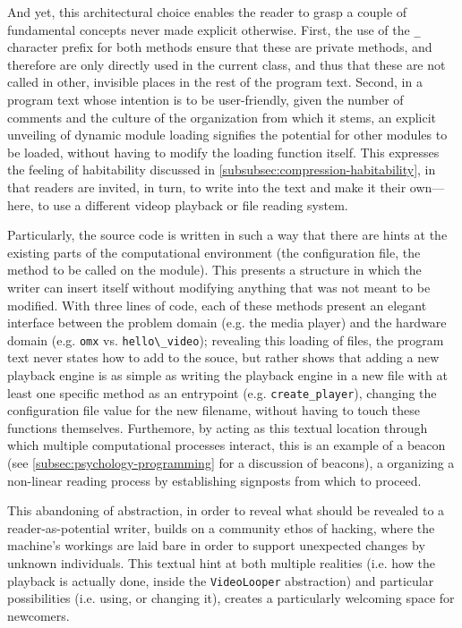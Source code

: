 And yet, this architectural choice enables the reader to grasp a couple of fundamental concepts never made explicit otherwise. First, the use of the \lstinline{_} character prefix for both methods ensure that these are private methods, and therefore are only directly used in the current class, and thus that these are not called in other, invisible places in the rest of the program text. Second, in a program text whose intention is to be user-friendly, given the number of comments and the culture of the organization from which it stems, an explicit unveiling of dynamic module loading signifies the potential for other modules to be loaded, without having to modify the loading function itself. This expresses the feeling of habitability discussed in \ref{subsubsec:compression-habitability}, in that readers are invited, in turn, to write into the text and make it their own—here, to use a different videop playback or file reading system.

Particularly, the source code is written in such a way that there are hints at the existing parts of the computational environment (the configuration file, the method to be called on the module). This presents a structure in which the writer can insert itself without modifying anything that was not meant to be modified. With three lines of code, each of these methods present an elegant interface between the problem domain (e.g. the media player) and the hardware domain (e.g. \lstinline{omx} vs. \lstinline{hello\_video}); revealing this loading of files, the program text never states how to add to the souce, but rather shows that adding a new playback engine is as simple as writing the playback engine in a new file with at least one specific method as an entrypoint (e.g. \lstinline{create_player}), changing the configuration file value for the new filename, without having to touch these functions themselves. Furthemore, by acting as this textual location through which multiple computational processes interact, this is an example of a beacon (see \ref{subsec:psychology-programming} for a discussion of beacons), a organizing a non-linear reading process by establishing signposts from which to proceed.

This abandoning of abstraction, in order to reveal what should be revealed to a reader-as-potential writer, builds on a community ethos of hacking, where the machine's workings are laid bare in order to support unexpected changes by unknown individuals. This textual hint at both multiple realities (i.e. how the playback is actually done, inside the \lstinline{VideoLooper} abstraction) and particular possibilities (i.e. using, or changing it), creates a particularly welcoming space for newcomers.

